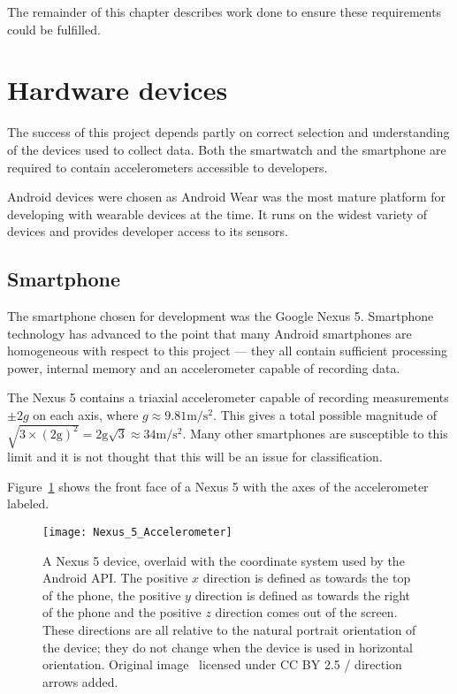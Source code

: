     The remainder of this chapter describes work done to ensure these requirements could be fulfilled.
  
  \section{Hardware devices}
    The success of this project depends partly on correct selection and understanding of the devices
    used to collect data. Both the smartwatch and the smartphone are required to contain accelerometers accessible to
    developers.
    
    Android devices were chosen as Android Wear was the most mature platform for developing with
    wearable devices at the time. It runs on the widest variety of devices and provides developer 
    access to its sensors.
    
    \subsection{Smartphone}
      The smartphone chosen for development was the Google Nexus 5. Smartphone technology has
      advanced to the point that many Android smartphones are homogeneous with respect to this
      project --- they all contain sufficient processing power, internal memory and an 
      accelerometer capable of recording data.
      
      The Nexus 5 contains a triaxial accelerometer capable of recording measurements $\pm2\si{g}$
      on each axis, where $\si{g} \approx 9.81\si{\metre\per\square\second}$. This gives a total possible magnitude of $\sqrt{3 \times (2\mathrm{g})^2} = 2\mathrm{g}\sqrt{3} \approx 34 \si{\metre\per\square\second}$. Many other smartphones are susceptible to this limit and it is not thought that this will be an issue for classification.
      
      Figure~\ref{fig:nexus-5-accelerometer} shows the front face of a Nexus 5 with the axes of the
      accelerometer labeled.
      
      \begin{figure}[!th]
        \centering
        \texttt{[image: Nexus\_5\_Accelerometer]}
        \caption[A Nexus 5 device, overlaid with the coordinate system used by the Android API.]{A Nexus 5 device, overlaid with the coordinate system used by the Android API. The positive $x$ direction is defined as towards the top of the phone, the positive $y$ direction is defined as towards the right of the phone and the positive $z$ direction comes out of the screen. These directions are all relative to the natural portrait orientation of the device; they do not change when the device is used in horizontal orientation. Original image~\cite{nexus-5} licensed under CC BY 2.5 / direction arrows added.}
        \label{fig:nexus-5-accelerometer}
      \end{figure}
      
